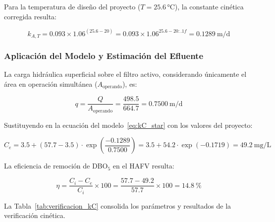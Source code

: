 \documentclass[12pt,a4paper]{article}
\begin{document}
Para la temperatura de diseño del proyecto ($T = 25.6$\,°C), la constante cinética corregida resulta:

\begin{equation}
k_{A,T} = 0.093 \times 1.06^{(25.6 - 20)} = 0.093 \times 1.06^{25.6 - 20:.1f} = 0.1289\ \text{m/d}
\end{equation}

\subsubsection*{Aplicación del Modelo y Estimación del Efluente}

La carga hidráulica superficial sobre el filtro activo, considerando únicamente el área en operación simultánea ($A_\text{operando}$), es:

\begin{equation}
q = \frac{Q}{A_\text{operando}} = \frac{498.5}{664.7} = 0.7500\ \text{m/d}
\end{equation}

Sustituyendo en la ecuación del modelo~\eqref{eq:kC_star} con los valores del proyecto:

\begin{equation}
C_e = 3.5 + (57.7 - 3.5) \cdot \exp\!\left(\frac{-0.1289}{0.7500}\right) = 3.5 + 54.2 \cdot \exp(-0.1719) = 49.2\ \text{mg/L}
\end{equation}

La eficiencia de remoción de DBO$_5$ en el HAFV resulta:

\begin{equation}
\eta = \frac{C_i - C_e}{C_i} \times 100 = \frac{57.7 - 49.2}{57.7} \times 100 = 14.8\ \%
\end{equation}

La Tabla~\ref{tab:verificacion_kC} consolida los parámetros y resultados de la verificación cinética.
\end{document}
